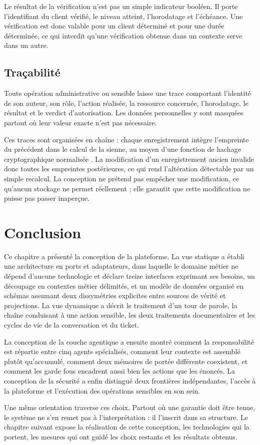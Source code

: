 Le résultat de la vérification n'est pas un simple indicateur booléen. Il porte l'identifiant du client vérifié, le niveau atteint, l'horodatage et l'échéance. Une vérification est donc valable pour un client déterminé et pour une durée déterminée, ce qui interdit qu'une vérification obtenue dans un contexte serve dans un autre.

\subsection{Traçabilité}

Toute opération administrative ou sensible laisse une trace comportant l'identité de son auteur, son rôle, l'action réalisée, la ressource concernée, l'horodatage, le résultat et le verdict d'autorisation. Les données personnelles y sont masquées partout où leur valeur exacte n'est pas nécessaire.

Ces traces sont organisées en chaîne : chaque enregistrement intègre l'empreinte du précédent dans le calcul de la sienne, au moyen d'une fonction de hachage cryptographique normalisée \cite{sha}. La modification d'un enregistrement ancien invalide donc toutes les empreintes postérieures, ce qui rend l'altération détectable par un simple recalcul. La conception ne prétend pas empêcher une modification, ce qu'aucun stockage ne permet réellement ; elle garantit que cette modification ne puisse pas passer inaperçue.

\section*{Conclusion}

Ce chapitre a présenté la conception de la plateforme. La vue statique a établi une architecture en ports et adaptateurs, dans laquelle le domaine métier ne dépend d'aucune technologie et déclare treize interfaces exprimant ses besoins, un découpage en contextes métier délimités, et un modèle de données organisé en schémas assumant deux dissymétries explicites entre sources de vérité et projections. La vue dynamique a décrit le traitement d'un tour de parole, la chaîne conduisant à une action sensible, les deux traitements documentaires et les cycles de vie de la conversation et du ticket.

La conception de la couche agentique a ensuite montré comment la responsabilité est répartie entre cinq agents spécialisés, comment leur contexte est assemblé plutôt qu'accumulé, comment deux mémoires de portée différente coexistent, et comment les garde fous encadrent aussi bien les actions que les énoncés. La conception de la sécurité a enfin distingué deux frontières indépendantes, l'accès à la plateforme et l'exécution des opérations sensibles en son sein.

Une même orientation traverse ces choix. Partout où une garantie doit être tenue, le système ne s'en remet pas à l'interprétation : il l'inscrit dans sa structure. Le chapitre suivant expose la réalisation de cette conception, les technologies qui la portent, les mesures qui ont guidé les choix restants et les résultats obtenus.
